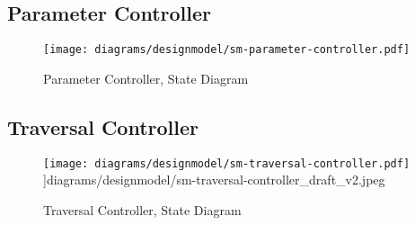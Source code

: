 % 
\subsection{Parameter Controller}
\begin{figure}[H]
    \centering
    \texttt{[image: diagrams/designmodel/sm-parameter-controller.pdf]}
    \caption{Parameter Controller, State Diagram}
    \label{fig:parameter-controller-sm}
\end{figure}
% 
\subsection{Traversal Controller}
\begin{figure}[H]
    \centering
    \texttt{[image: diagrams/designmodel/sm-traversal-controller.pdf]}
    ]{diagrams/designmodel/sm-traversal-controller_draft_v2.jpeg}
    \caption{Traversal Controller, State Diagram}
    \label{fig:traversal-controller-sm}
\end{figure}
% 
